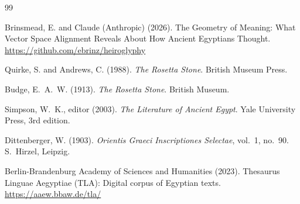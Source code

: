 \documentclass[11pt, a4paper]{article}
\begin{document}

\begin{thebibliography}{99}

Brinsmead, E. and Claude (Anthropic) (2026).
\newblock The Geometry of Meaning: What Vector Space Alignment Reveals About How Ancient Egyptians Thought.
\newblock \url{https://github.com/ebrinz/heiroglyphy}

Quirke, S. and Andrews, C. (1988).
\newblock \textit{The Rosetta Stone}.
\newblock British Museum Press.

Budge, E.~A.~W. (1913).
\newblock \textit{The Rosetta Stone}.
\newblock British Museum.

Simpson, W.~K., editor (2003).
\newblock \textit{The Literature of Ancient Egypt}.
\newblock Yale University Press, 3rd edition.

Dittenberger, W. (1903).
\newblock \textit{Orientis Graeci Inscriptiones Selectae}, vol.~1, no.~90.
\newblock S.~Hirzel, Leipzig.

Berlin-Brandenburg Academy of Sciences and Humanities (2023).
\newblock Thesaurus Linguae Aegyptiae (TLA): Digital corpus of Egyptian texts.
\newblock \url{https://aaew.bbaw.de/tla/}

\end{thebibliography}
\end{document}
